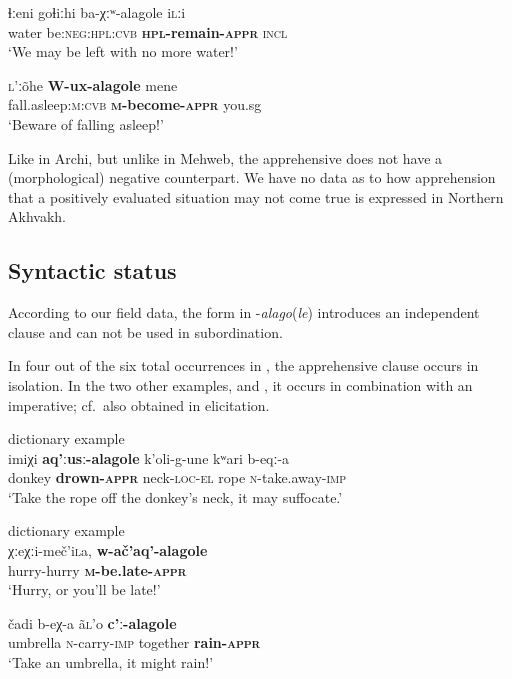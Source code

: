 \documentclass[output=paper,colorlinks,citecolor=brown]{langscibook}
\begin{document}
\ea \label{ex:DD68}
\gll ɬːeni goɬiːhi ba-χːʷ-alagole i\textsc{l}ːi \\
water be:\textsc{neg:hpl:cvb} \textbf{\textsc{hpl}-remain-\textsc{appr}} \textsc{incl} \\
\glt `We may be left with no more water!'
\z


\ea \label{ex:DD69}
\gll \textsc{l}'ːõhe \textbf{W-ux-alagole} mene \\
fall.asleep:\textsc{m:cvb} \textbf{\textsc{m}-become-\textsc{appr}} you.sg \\
\glt `Beware of falling asleep!'
\z


 Like in Archi, but unlike in Mehweb, the apprehensive does not have a (morphological) negative counterpart. We have no data as to how apprehension that a positively evaluated situation may not come true is expressed in Northern Akhvakh.
 

\subsection{Syntactic status}
\label{subsec:NAsyntactic}
 
According to our field data, the form in \nobreakdash-\textit{alago}(\textit{le}) introduces an independent clause and can not be used in subordination. 

In four out of the six total occurrences in \citet{MagomedovaAbdulaeva2007}, the apprehensive clause occurs in isolation. In the two other examples,  and , it occurs in combination with an imperative; cf.\ also  obtained in elicitation. 

\ea \label{ex:DD70} \textnormal{dictionary example} \\
\gll imiχi \textbf{aq'ːusː-alagole} k'oli-g-une  kʷari  b-eqː-a  \\
donkey \textbf{drown-\textsc{appr}} neck-\textsc{loc-el} rope \textsc{n}-take.away-\textsc{imp} \\
\glt `Take the rope off the donkey's neck, it may suffocate.'
\z

\ea \label{ex:DD71} \textnormal{dictionary example} \\
\gll χːeχːi-meč'i\textsc{l}a, \textbf{w-ač'aq'-alagole} \\
hurry-hurry \textbf{\textsc{m}-be.late-\textsc{appr}} \\
\glt `Hurry, or you'll be late!'
\z

\ea \label{ex:DD72}
\gll čadi b-eχ-a ã\textsc{l}'o \textbf{c'ː-alagole} \\
umbrella \textsc{n}-carry-\textsc{imp} together \textbf{rain-\textsc{appr}} \\
\glt `Take an umbrella, it might rain!'
\z  
\end{document}
